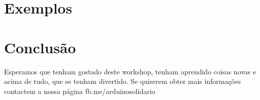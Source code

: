 \documentclass{article}
\begin{document}

\section{Exemplos}

\section{Conclusão}
Esperamos que tenham gostado deste workshop, tenham aprendido coisas novas e acima de tudo, que se tenham divertido.
Se quiserem obter mais informações contactem a nossa página fb.me/arduinosolidario
\end{document}
